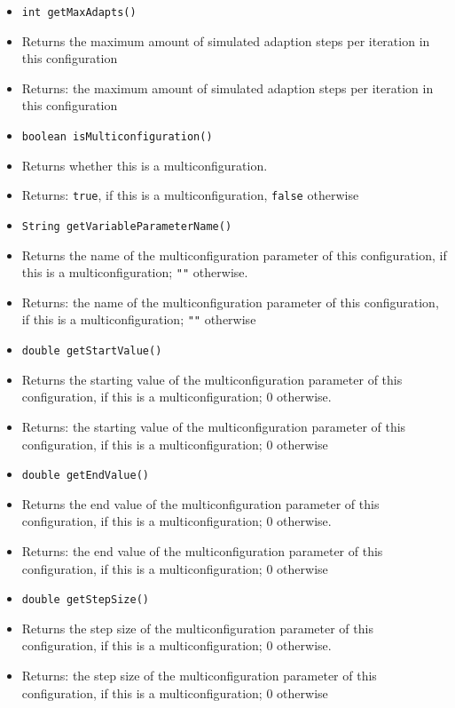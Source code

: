 \documentclass[parskip=full,11pt]{scrartcl}
\begin{document}
\begin{itemize}
	\item \texttt{int getMaxAdapts()}
	\item[] Returns the maximum amount of simulated adaption steps per iteration in this configuration
	\item[] Returns: the maximum amount of simulated adaption steps per iteration in this configuration
	
	\item \texttt{boolean isMulticonfiguration()}
	\item[] Returns whether this is a multiconfiguration.
	\item[] Returns: \texttt{true}, if this is a multiconfiguration, \texttt{false} otherwise
	
	\item \texttt{String getVariableParameterName()}
	\item[] Returns the name of the multiconfiguration parameter of this configuration, if this is a multiconfiguration; \texttt{""} otherwise.
	\item[] Returns: the name of the multiconfiguration parameter of this configuration, if this is a multiconfiguration; \texttt{""} otherwise
	
	\item \texttt{double getStartValue()}
	\item[] Returns the starting value of the multiconfiguration parameter of this configuration, if this is a multiconfiguration; \(0\) otherwise.
	\item[] Returns: the starting value of the multiconfiguration parameter of this configuration, if this is a multiconfiguration; \(0\) otherwise
	
	\item \texttt{double getEndValue()}
	\item[] Returns the end value of the multiconfiguration parameter of this configuration, if this is a multiconfiguration; \(0\) otherwise.
	\item[] Returns: the end value of the multiconfiguration parameter of this configuration, if this is a multiconfiguration; \(0\) otherwise
	
	\item \texttt{double getStepSize()}
	\item[] Returns the step size of the multiconfiguration parameter of this configuration, if this is a multiconfiguration; \(0\) otherwise.
	\item[] Returns: the step size of the multiconfiguration parameter of this configuration, if this is a multiconfiguration; \(0\) otherwise
	
	
\end{itemize}
\end{document}
